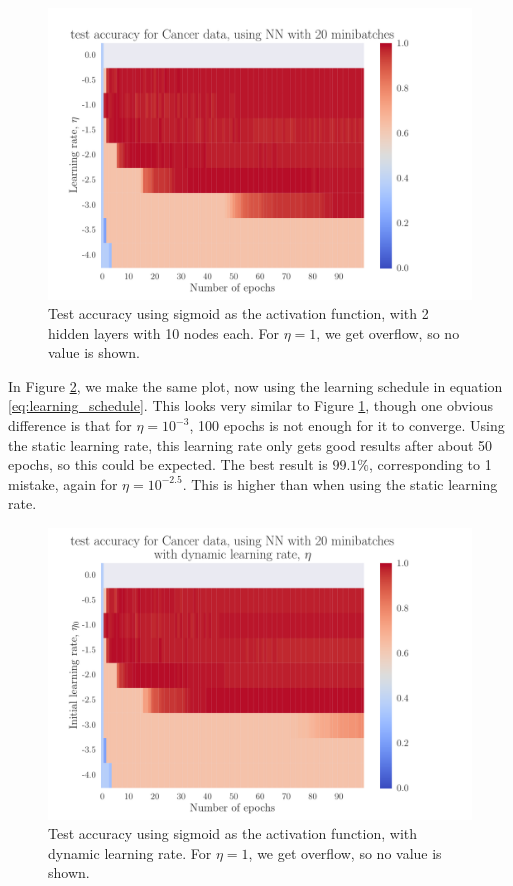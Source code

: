 \documentclass[12pt]{extarticle}
\begin{document}
\begin{figure}[h]
	\includegraphics[width=\linewidth]{plots/NN_Cancer__epochs_eta__test_accuracy__892274.pdf}
	\caption{Test accuracy using sigmoid as the activation function, with 2 hidden layers with 10 nodes each. For $\eta=1$, we get overflow, so no value is shown. }\label{fig:NN_Cancer_sigmoid}
\end{figure}

In Figure \ref{fig:NN_Cancer_sigmoid_dynam_eta}, we make the same plot, now using the learning schedule in equation \eqref{eq:learning_schedule}. This looks very similar to Figure \ref{fig:NN_Cancer_sigmoid}, though one obvious difference is that for $\eta=10^{-3}$, 100 epochs is not enough for it to converge. Using the static learning rate, this learning rate only gets good results after about 50 epochs, so this could be expected. The best result is $99.1\%$, corresponding to 1 mistake, again for $\eta=10^{-2.5}$. This is higher than when using the static learning rate.

\begin{figure}[h]
	\includegraphics[width=\linewidth]{plots/NN_Cancer__epochs_dynamic_eta__test_accuracy__354289.pdf}
	\caption{Test accuracy using sigmoid as the activation function, with dynamic learning rate. For $\eta=1$, we get overflow, so no value is shown. }\label{fig:NN_Cancer_sigmoid_dynam_eta}
\end{figure}
\end{document}
